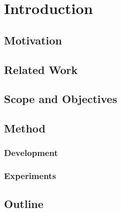 \chapter{Introduction}
\label{chp:intro} 

\section{Motivation}
\cite{Blocki2014}

\section{Related Work}

\section{Scope and Objectives}

\section{Method}
\subsection{Development}
\subsection{Experiments}

\section{Outline}

